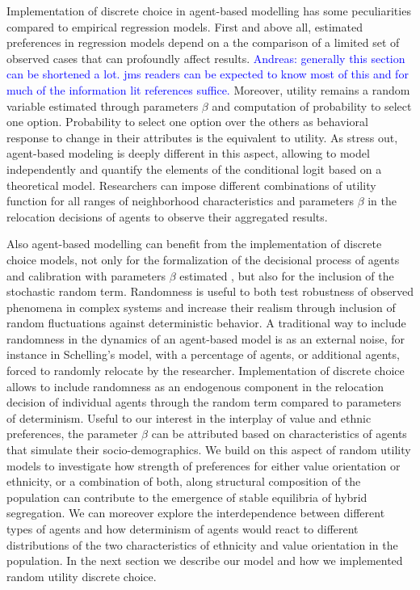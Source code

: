 \documentclass[
]{article}
\begin{document}
Implementation of discrete choice in agent-based modelling has some
peculiarities compared to empirical regression models. First and above
all, estimated preferences in regression models depend on a the
comparison of a limited set of observed cases that can profoundly affect
results.
\textcolor{blue}{{Andreas: }generally this section can be shortened a lot. jms readers can be expected to know most of this and for much of the information lit references suffice.}
Moreover, utility remains a random variable estimated through parameters
\(\beta\) and computation of probability to select one option.
Probability to select one option over the others as behavioral response
to change in their attributes is the equivalent to utility. As
\cite{bruch2009preferences} stress out, agent-based modeling is deeply
different in this aspect, allowing to model independently and quantify
the elements of the conditional logit based on a theoretical model.
Researchers can impose different combinations of utility function for
all ranges of neighborhood characteristics and parameters \(\beta\) in
the relocation decisions of agents to observe their aggregated results.

Also agent-based modelling can benefit from the implementation of
discrete choice models, not only for the formalization of the decisional
process of agents and calibration with parameters \(\beta\) estimated
\citep{bruch2006neighborhood}, but also for the inclusion of the
stochastic random term. Randomness is useful to both test robustness of
observed phenomena in complex systems and increase their realism through
inclusion of random fluctuations against deterministic behavior. A
traditional way to include randomness in the dynamics of an agent-based
model is as an external noise, for instance in Schelling's model, with a
percentage of agents, or additional agents, forced to randomly relocate
by the researcher. Implementation of discrete choice allows to include
randomness as an endogenous component in the relocation decision of
individual agents through the random term compared to parameters of
determinism. Useful to our interest in the interplay of value and ethnic
preferences, the parameter \(\beta\) can be attributed based on
characteristics of agents that simulate their socio-demographics. We
build on this aspect of random utility models to investigate how
strength of preferences for either value orientation or ethnicity, or a
combination of both, along structural composition of the population can
contribute to the emergence of stable equilibria of hybrid segregation.
We can moreover explore the interdependence between different types of
agents and how determinism of agents would react to different
distributions of the two characteristics of ethnicity and value
orientation in the population. In the next section we describe our model
and how we implemented random utility discrete choice.
\end{document}
